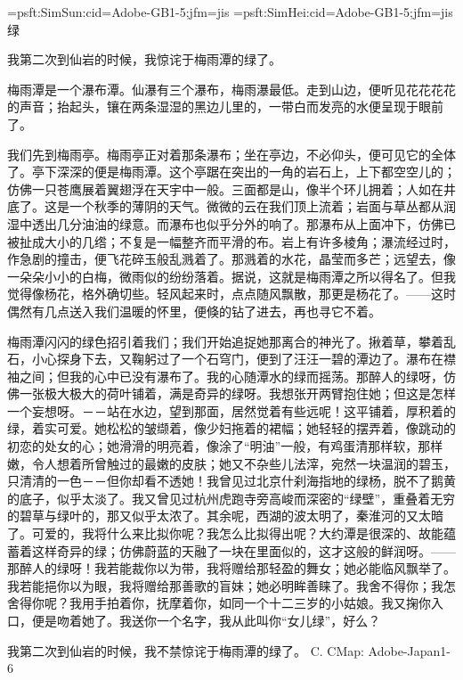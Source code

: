 \jfont\testA={psft:SimSun:cid=Adobe-GB1-5;jfm=jis}
\jfont\testB={psft:SimHei:cid=Adobe-GB1-5;jfm=jis}
\testB
\noindent 绿\par
\smallskip
{}\par
\medskip
\testA
我第二次到仙岩的时候，我惊诧于梅雨潭的绿了。

梅雨潭是一个瀑布潭。仙瀑有三个瀑布，梅雨瀑最低。走到山边，便听见花花花花的声音；抬起头，镶在两条湿湿的黑边儿里的，一带白而发亮的水便呈现于眼前了。

我们先到梅雨亭。梅雨亭正对着那条瀑布；坐在亭边，不必仰头，便可见它的全体了。亭下深深的便是梅雨潭。这个亭踞在突出的一角的岩石上，上下都空空儿的；仿佛一只苍鹰展着翼翅浮在天宇中一般。三面都是山，像半个环儿拥着；人如在井底了。这是一个秋季的薄阴的天气。微微的云在我们顶上流着；岩面与草丛都从润湿中透出几分油油的绿意。而瀑布也似乎分外的响了。那瀑布从上面冲下，仿佛已被扯成大小的几绺；不复是一幅整齐而平滑的布。岩上有许多棱角；瀑流经过时，作急剧的撞击，便飞花碎玉般乱溅着了。那溅着的水花，晶莹而多芒；远望去，像一朵朵小小的白梅，微雨似的纷纷落着。据说，这就是梅雨潭之所以得名了。但我觉得像杨花，格外确切些。轻风起来时，点点随风飘散，那更是杨花了。——这时偶然有几点送入我们温暖的怀里，便倏的钻了进去，再也寻它不着。

梅雨潭闪闪的绿色招引着我们；我们开始追捉她那离合的神光了。揪着草，攀着乱石，小心探身下去，又鞠躬过了一个石穹门，便到了汪汪一碧的潭边了。瀑布在襟袖之间；但我的心中已没有瀑布了。我的心随潭水的绿而摇荡。那醉人的绿呀，仿佛一张极大极大的荷叶铺着，满是奇异的绿呀。我想张开两臂抱住她；但这是怎样一个妄想呀。－－站在水边，望到那面，居然觉着有些远呢！这平铺着，厚积着的绿，着实可爱。她松松的皱缬着，像少妇拖着的裙幅；她轻轻的摆弄着，像跳动的初恋的处女的心；她滑滑的明亮着，像涂了“明油”一般，有鸡蛋清那样软，那样嫩，令人想着所曾触过的最嫩的皮肤；她又不杂些儿法滓，宛然一块温润的碧玉，只清清的一色－－但你却看不透她！我曾见过北京什刹海指地的绿杨，脱不了鹅黄的底子，似乎太淡了。我又曾见过杭州虎跑寺旁高峻而深密的“绿壁”，重叠着无穷的碧草与绿叶的，那又似乎太浓了。其余呢，西湖的波太明了，秦淮河的又太暗了。可爱的，我将什么来比拟你呢？我怎么比拟得出呢？大约潭是很深的、故能蕴蓄着这样奇异的绿；仿佛蔚蓝的天融了一块在里面似的，这才这般的鲜润呀。——那醉人的绿呀！我若能裁你以为带，我将赠给那轻盈的舞女；她必能临风飘举了。我若能挹你以为眼，我将赠给那善歌的盲妹；她必明眸善睐了。我舍不得你；我怎舍得你呢？我用手拍着你，抚摩着你，如同一个十二三岁的小姑娘。我又掬你入口，便是吻着她了。我送你一个名字，我从此叫你“女儿绿”，好么？

我第二次到仙岩的时候，我不禁惊诧于梅雨潭的绿了。 
\beginsection C. CMap: Adobe-Japan1-6

